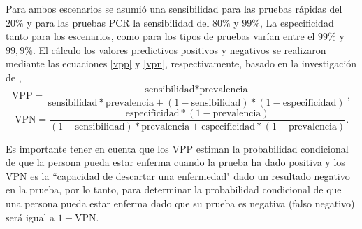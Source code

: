 \documentclass{article}
\begin{document}
Para ambos escenarios se asumió una sensibilidad para las pruebas rápidas del $20\%$ y para las pruebas PCR la sensibilidad del $80\%$ y $99\%$, La especificidad tanto para los escenarios, como para los tipos de pruebas varían entre el $99\%$ y $99,9\%$. El cálculo los valores predictivos positivos y negativos se realizaron mediante las ecuaciones \ref{vpp} y \ref{vpn}, respectivamente, basado en la investigación de \cite{bayes},
\begin{equation}
\text{VPP}= \frac{\text{sensibilidad} * \text{prevalencia}}{\text{sensibilidad} * \text{prevalencia} + (1- \text{sensibilidad})*(1-\text{especificidad})},
\label{vpp}
\end{equation}
\begin{equation}
\text{VPN}= \frac{\text{especificidad} * (1- \text{prevalencia})}{(1- \text{sensibilidad}) * \text{prevalencia} + \text{especificidad} * (1- \text{prevalencia})}.
\label{vpn}
\end{equation}

Es importante tener en cuenta que los VPP estiman la probabilidad condicional de que la persona pueda estar enferma cuando la prueba ha dado positiva y los VPN es la ``capacidad de descartar una enfermedad" dado un resultado negativo en la prueba, por lo tanto, para determinar la probabilidad condicional de que una persona pueda estar enferma dado que su prueba es negativa (falso negativo) será igual a $1 -$VPN. 
\end{document}
